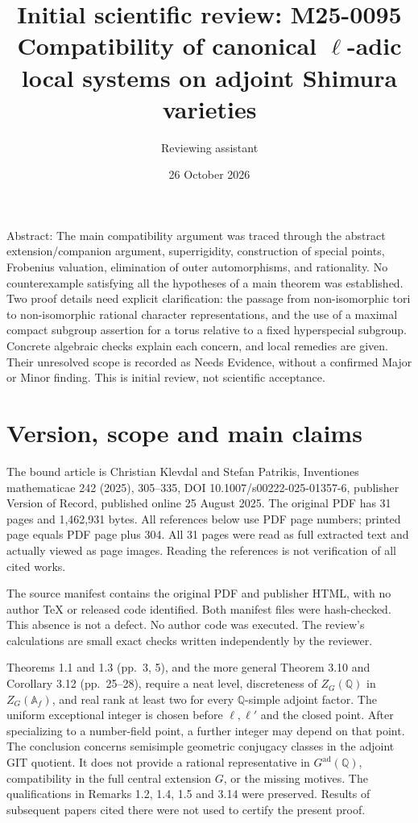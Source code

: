 \documentclass[10pt]{article}
\title{Initial scientific review: M25-0095
Compatibility of canonical \(\ell\)-adic local systems
on adjoint Shimura varieties}
\author{Reviewing assistant}
\date{26 October 2026}
\begin{document}
\maketitle
Abstract: The main compatibility argument was traced through the abstract extension/companion argument, superrigidity, construction of special points, Frobenius valuation, elimination of outer automorphisms, and rationality. No counterexample satisfying all the hypotheses of a main theorem was established. Two proof details need explicit clarification: the passage from non-isomorphic tori to non-isomorphic rational character representations, and the use of a maximal compact subgroup assertion for a torus relative to a fixed hyperspecial subgroup. Concrete algebraic checks explain each concern, and local remedies are given. Their unresolved scope is recorded as Needs Evidence, without a confirmed Major or Minor finding. This is initial review, not scientific acceptance.\par
\section*{Version, scope and main claims}
The bound article is Christian Klevdal and Stefan Patrikis, Inventiones mathematicae 242 (2025), 305–335, DOI 10.1007/s00222-025-01357-6, publisher Version of Record, published online 25 August 2025. The original PDF has 31 pages and 1,462,931 bytes. All references below use PDF page numbers; printed page equals PDF page plus 304. All 31 pages were read as full extracted text and actually viewed as page images. Reading the references is not verification of all cited works.\par
The source manifest contains the original PDF and publisher HTML, with no author TeX or released code identified. Both manifest files were hash-checked. This absence is not a defect. No author code was executed. The review’s calculations are small exact checks written independently by the reviewer.\par
Theorems 1.1 and 1.3 (pp. 3, 5), and the more general Theorem 3.10 and Corollary 3.12 (pp. 25–28), require a neat level, discreteness of \(Z_G(\mathbb Q)\) in \(Z_G(\mathbb A_f)\), and real rank at least two for every \(\mathbb Q\)-simple adjoint factor. The uniform exceptional integer is chosen before \(\ell,\ell'\) and the closed point. After specializing to a number-field point, a further integer may depend on that point. The conclusion concerns semisimple geometric conjugacy classes in the adjoint GIT quotient. It does not provide a rational representative in \(G^\mathrm{ad}(\mathbb Q)\), compatibility in the full central extension \(G\), or the missing motives. The qualifications in Remarks 1.2, 1.4, 1.5 and 3.14 were preserved. Results of subsequent papers cited there were not used to certify the present proof.\par
\end{document}
